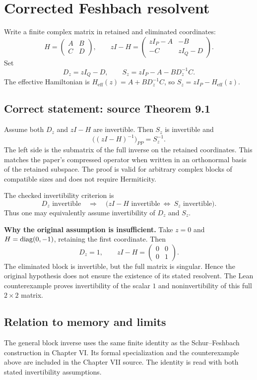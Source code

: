 \section{Corrected Feshbach resolvent}\label{supp1:section:003}
Write a finite complex matrix in retained and eliminated coordinates:
\[
H=\begin{pmatrix}A&B\\C&D\end{pmatrix},\qquad
zI-H=\begin{pmatrix}zI_P-A&-B\\-C&zI_Q-D\end{pmatrix}.
\]
Set
\[
D_z=zI_Q-D,\qquad S_z=zI_P-A-BD_z^{-1}C.
\]
The effective Hamiltonian is $H_{\mathrm{eff}}(z)=A+BD_z^{-1}C$, so
$S_z=zI_P-H_{\mathrm{eff}}(z)$.

\subsection{Correct statement: source Theorem 9.1}
Assume both $D_z$ and $zI-H$ are invertible. Then $S_z$ is invertible and
\[
\boxed{\bigl((zI-H)^{-1}\bigr)_{PP}=S_z^{-1}.}
\]
The left side is the submatrix of the full inverse on the retained coordinates. This matches the paper's compressed operator when written in an orthonormal basis of the retained subspace. The proof is valid for arbitrary complex blocks of compatible sizes and does not require Hermiticity.

The checked invertibility criterion is
\[
D_z\text{ invertible}\quad\Longrightarrow\quad
\bigl(zI-H\text{ invertible}\ \Longleftrightarrow\ S_z\text{ invertible}\bigr).
\]
Thus one may equivalently assume invertibility of $D_z$ and $S_z$.

\textbf{Why the original assumption is insufficient.}
Take $z=0$ and $H=\operatorname{diag}(0,-1)$, retaining the first coordinate. Then
\[
D_z=1,\qquad zI-H=\begin{pmatrix}0&0\\0&1\end{pmatrix}.
\]
The eliminated block is invertible, but the full matrix is singular. Hence the original hypothesis does not ensure the existence of its stated resolvent. The Lean counterexample proves invertibility of the scalar $1$ and noninvertibility of this full $2\times2$ matrix.



\subsection{Relation to memory and limits}
The general block inverse uses the same finite identity as the Schur--Feshbach construction in Chapter VI. Its formal specialization and the counterexample above are included in the Chapter VII source. The identity is read with both stated invertibility assumptions.


